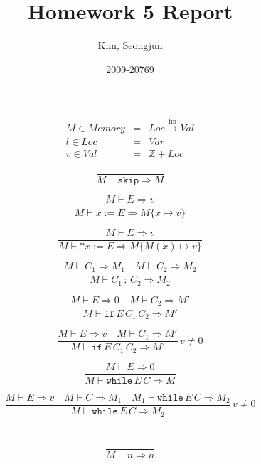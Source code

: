 \documentclass{article}
\begin{document}
\title{Homework 5 Report}
\author{Kim, Seongjun}
\date{2009-20769}
\maketitle

\begin{eqnarray*}
  M \in Memory & = & Loc \stackrel{\textrm{fin}}{\to} Val \\
  l \in Loc & = & Var \\
  v \in Val & = & \mathbb{Z} + Loc
\end{eqnarray*}

\begin{displaymath}
  \frac{ }{M \vdash \texttt{skip} \Rightarrow M}
\end{displaymath}

\begin{displaymath}
  \frac{M \vdash E \Rightarrow v}{M \vdash x := E \Rightarrow M\{x \mapsto v\}}
\end{displaymath}

\begin{displaymath}
  \frac{M \vdash E \Rightarrow v}{M \vdash *x := E \Rightarrow M\{M(x) \mapsto v\}}
\end{displaymath}

\begin{displaymath}
  \frac{M \vdash {C}_{1} \Rightarrow {M}_{1} \quad M \vdash {C}_{2} \Rightarrow {M}_{2}}{M \vdash {C}_{1} \, ; \, {C}_{2} \Rightarrow {M}_{2}}
\end{displaymath}

\begin{displaymath}
  \frac{M \vdash E \Rightarrow 0 \quad M \vdash {C}_{2} \Rightarrow M'}{M \vdash \texttt{if} \, E \, {C}_{1} \, {C}_{2} \Rightarrow M'}
\end{displaymath}

\begin{displaymath}
  \frac{M \vdash E \Rightarrow v \quad M \vdash {C}_{1} \Rightarrow M'}{M \vdash \texttt{if} \, E \, {C}_{1} \, {C}_{2} \Rightarrow M'} \, v \neq 0
\end{displaymath}

\begin{displaymath}
  \frac{M \vdash E \Rightarrow 0}{M \vdash \texttt{while} \, E \, C \Rightarrow M}
\end{displaymath}

\begin{displaymath}
  \frac{M \vdash E \Rightarrow v \quad M \vdash C \Rightarrow {M}_{1} \quad {M}_{1} \vdash \texttt{while} \, E \, C \Rightarrow {M}_{2}}{M \vdash \texttt{while} \, E \, C \Rightarrow {M}_{2}} \, v \neq 0
\end{displaymath}
\\
\\
\begin{displaymath}
  \frac{ }{M \vdash n \Rightarrow n}
\end{displaymath}
\end{document}
